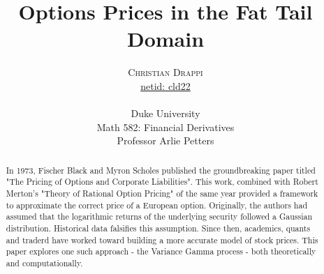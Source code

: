 \documentclass[twoside]{article}
\title{\vspace{-15mm}\fontsize{24pt}{10pt}\selectfont\textbf{Options Prices in the Fat Tail Domain}} %
\author{
\large
\textsc{Christian Drappi}\\[0.5mm] %
\normalsize \href{mailto:cld22@duke.edu}{netid: cld22} \\ \\ %
\normalsize Duke University \\ %
\normalsize Math 582: Financial Derivatives \\
\normalsize Professor Arlie Petters \\
\vspace{-5mm}
}
\date{}
\begin{document}
\maketitle %

\thispagestyle{fancy} %


\begin{abstract}

\noindent In 1973, Fischer Black and Myron Scholes published the groundbreaking paper titled "The Pricing of Options and Corporate Liabilities". This work, combined with Robert Merton's "Theory of Rational Option Pricing" of the same year provided a framework to approximate the correct price of a European option. Originally, the authors had assumed that the logarithmic returns of the underlying security followed a Gaussian distribution. Historical data falsifies this assumption. Since then, academics, quants and traderd have worked toward building a more accurate model of stock prices. This paper explores one such approach - the Variance Gamma process - both theoretically and computationally.

\end{abstract}

\end{document}
